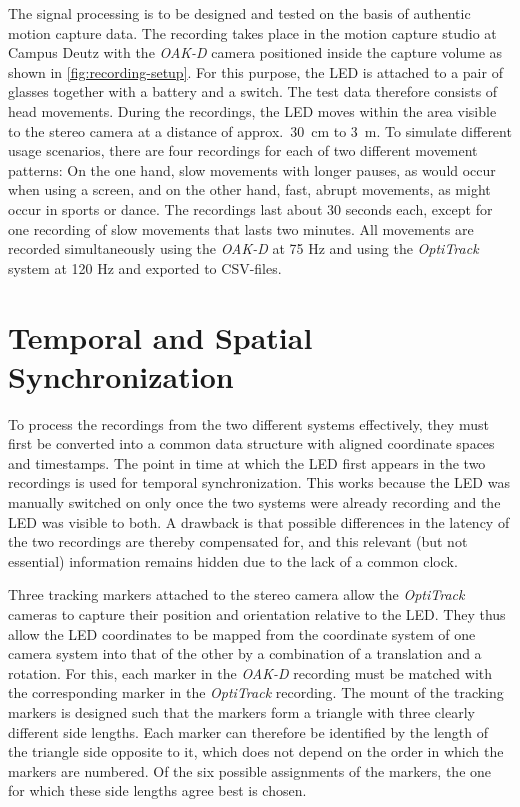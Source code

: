 \documentclass{siamart251216}
\begin{document}
The signal processing is to be designed and tested on the basis of authentic motion capture data.
The recording takes place in the motion capture studio at Campus Deutz with the \emph{OAK-D} camera positioned inside the capture volume as shown in \cref{fig:recording-setup}.
For this purpose, the LED is attached to a pair of glasses together with a battery and a switch.
The test data therefore consists of head movements.
During the recordings, the LED moves within the area visible to the stereo camera at a distance of approx.\ 30~cm to 3~m.
To simulate different usage scenarios, there are four recordings for each of two different movement patterns:
On the one hand, slow movements with longer pauses, as would occur when using a screen, and on the other hand, fast, abrupt movements, as might occur in sports or dance.
The recordings last about 30 seconds each, except for one recording of slow movements that lasts two minutes.
All movements are recorded simultaneously using the \emph{OAK-D} at 75 Hz and using the \emph{OptiTrack} system at 120 Hz and exported to CSV-files.

\section{Temporal and Spatial Synchronization}
\label{sec:sync}

To process the recordings from the two different systems effectively, they must first be converted into a common data structure with aligned coordinate spaces and timestamps.
The point in time at which the LED first appears in the two recordings is used for temporal synchronization.
This works because the LED was manually switched on only once the two systems were already recording and the LED was visible to both.
A drawback is that possible differences in the latency of the two recordings are thereby compensated for, and this relevant (but not essential) information remains hidden due to the lack of a common clock.

Three tracking markers attached to the stereo camera allow the \emph{OptiTrack} cameras to capture their position and orientation relative to the LED.
They thus allow the LED coordinates to be mapped from the coordinate system of one camera system into that of the other by a combination of a translation and a rotation.
For this, each marker in the \emph{OAK-D} recording must be matched with the corresponding marker in the \emph{OptiTrack} recording.
The mount of the tracking markers is designed such that the markers form a triangle with three clearly different side lengths.
Each marker can therefore be identified by the length of the triangle side opposite to it, which does not depend on the order in which the markers are numbered.
Of the six possible assignments of the markers, the one for which these side lengths agree best is chosen.
\end{document}
